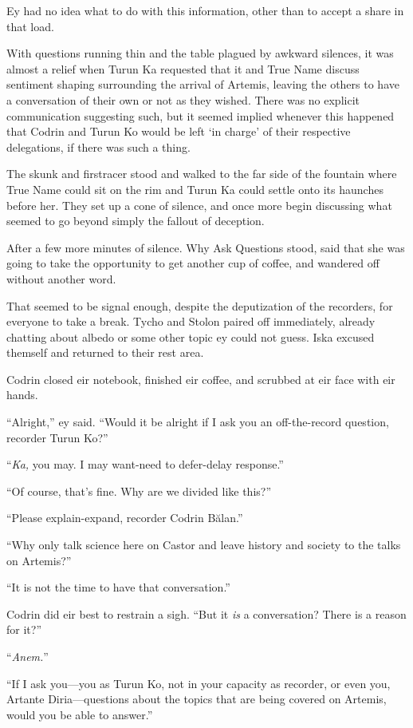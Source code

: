 Ey had no idea what to do with this information, other than to accept a share in that load.

With questions running thin and the table plagued by awkward silences, it was almost a relief when Turun Ka requested that it and True Name discuss sentiment shaping surrounding the arrival of Artemis, leaving the others to have a conversation of their own or not as they wished. There was no explicit communication suggesting such, but it seemed implied whenever this happened that Codrin and Turun Ko would be left `in charge' of their respective delegations, if there was such a thing.

The skunk and firstracer stood and walked to the far side of the fountain where True Name could sit on the rim and Turun Ka could settle onto its haunches before her. They set up a cone of silence, and once more begin discussing what seemed to go beyond simply the fallout of deception.

After a few more minutes of silence. Why Ask Questions stood, said that she was going to take the opportunity to get another cup of coffee, and wandered off without another word.

That seemed to be signal enough, despite the deputization of the recorders, for everyone to take a break. Tycho and Stolon paired off immediately, already chatting about albedo or some other topic ey could not guess. Iska excused themself and returned to their rest area.

Codrin closed eir notebook, finished eir coffee, and scrubbed at eir face with eir hands.

``Alright,'' ey said. ``Would it be alright if I ask you an off-the-record question, recorder Turun Ko?''

``\emph{Ka,} you may. I may want-need to defer-delay response.''

``Of course, that's fine. Why are we divided like this?''

``Please explain-expand, recorder Codrin Bălan.''

``Why only talk science here on Castor and leave history and society to the talks on Artemis?''

``It is not the time to have that conversation.''

Codrin did eir best to restrain a sigh. ``But it \emph{is} a conversation? There is a reason for it?''

``\emph{Anem.}''

``If I ask you—you as Turun Ko, not in your capacity as recorder, or even you, Artante Diria—questions about the topics that are being covered on Artemis, would you be able to answer.''

